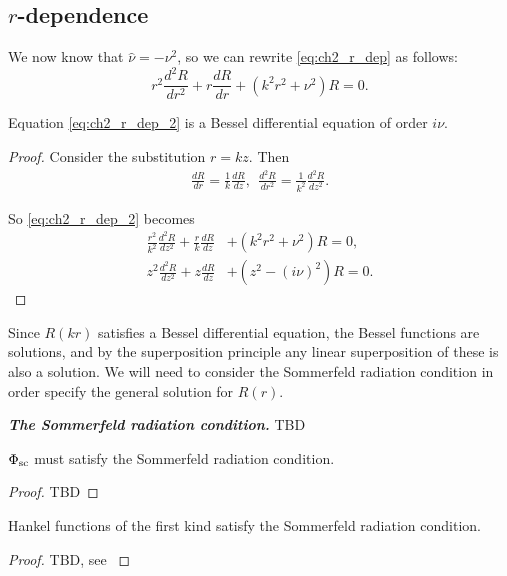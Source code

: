 \subsection{\texorpdfstring{$r$}{r}-dependence}
We now know that $\hat{\nu} = - \nu^2$, so we can rewrite \eqref{eq:ch2_r_dep} as follows:
    \begin{equation}\label{eq:ch2_r_dep_2}
        r^2 \frac{d^2 R}{dr^2} + r \frac{d R}{dr} + (k^2r^2 + \nu^2) R = 0.
    \end{equation}
    \begin{propn}
    Equation \eqref{eq:ch2_r_dep_2} is a Bessel differential equation of order $i\nu$.
    \end{propn}
    \begin{proof} Consider the substitution $r=kz$. Then
        \begin{align*}
            \frac{dR}{dr} = \frac{1}{k} \frac{dR}{dz}, ~~
            \frac{d^2R}{dr^2} = \frac{1}{k^2} \frac{d^2R}{dz^2}.
        \end{align*}\par
    So \eqref{eq:ch2_r_dep_2} becomes
        \begin{align}
            \frac{r^2}{k^2}\frac{d^2R}{dz^2}
                + \frac{r}{k}\frac{dR}{dz}
                &+ (k^2r^2 + \nu^2)R = 0, \\
            z^2 \frac{d^2 R}{dz^2}
                + z \frac{dR}{dz}
                &+ (z^2 - (i\nu)^2)R = 0.
        \end{align}
    \end{proof}\par
%
Since $R(kr)$ satisfies a Bessel differential equation, the Bessel functions are solutions, and by the superposition principle any linear superposition of these is also a solution. We will need to consider the Sommerfeld radiation condition in order specify the general solution for $R(r)$. \par
%
    \begin{defn}\textbf{\emph{The Sommerfeld radiation condition.}} TBD
    \end{defn}
%
    \begin{propn}
        $\Phi_{\text{sc}}$ must satisfy the Sommerfeld radiation condition.
    \end{propn}
    \begin{proof} TBD
    \end{proof}
%
    \begin{propn}
        Hankel functions of the first kind satisfy the Sommerfeld radiation condition.
    \end{propn}
    \begin{proof}
        TBD, see \cite[$\S$4.2]{martin06scattering}
    \end{proof}
%
